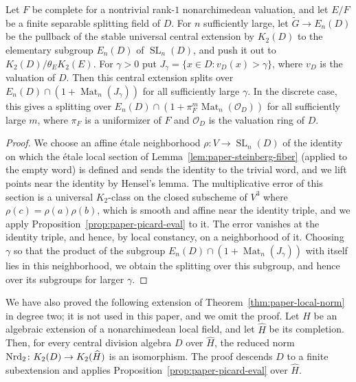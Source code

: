 \begin{corollary}\label{cor:paper-congruence-splitting}
Let $F$ be complete for a nontrivial rank-$1$ nonarchimedean valuation, and let $E/F$ be a finite separable splitting field of $D$.
For $n$ sufficiently large, let $\widetilde G\to E_n(D)$ be the pullback of the stable universal central extension by $K_2(D)$ to the elementary subgroup $E_n(D)$ of $\operatorname{SL}_n(D)$, and push it out to $K_2(D)/\theta_E K_2(E)$.
For $\gamma>0$ put $J_\gamma=\{x\in D:v_D(x)>\gamma\}$, where $v_D$ is the valuation of $D$.
Then this central extension splits over $E_n(D)\cap(1+\operatorname{Mat}_n(J_\gamma))$ for all sufficiently large $\gamma$.
In the discrete case, this gives a splitting over $E_n(D)\cap(1+\pi_F^m\operatorname{Mat}_n(\mathcal O_D))$ for all sufficiently large $m$, where $\pi_F$ is a uniformizer of $F$ and $\mathcal O_D$ is the valuation ring of $D$.
\end{corollary}
\begin{proof}
We choose an affine \'etale neighborhood $\rho\colon V\to\operatorname{SL}_n(D)$ of the identity on which the \'etale local section of Lemma~\ref{lem:paper-steinberg-fiber} (applied to the empty word) is defined and sends the identity to the trivial word, and we lift points near the identity by Hensel's lemma.
The multiplicative error of this section is a universal $K_2$-class on the closed subscheme of $V^3$ where $\rho(c)=\rho(a)\rho(b)$, which is smooth and affine near the identity triple, and we apply Proposition~\ref{prop:paper-picard-eval} to it.
The error vanishes at the identity triple, and hence, by local constancy, on a neighborhood of it.
Choosing $\gamma$ so that the product of the subgroup $E_n(D)\cap(1+\operatorname{Mat}_n(J_\gamma))$ with itself lies in this neighborhood, we obtain the splitting over this subgroup, and hence over its subgroups for larger $\gamma$.
\end{proof}

\begin{remark}\label{rem:paper-local-completion}
We have also proved the following extension of Theorem~\ref{thm:paper-local-norm} in degree two; it is not used in this paper, and we omit the proof.
Let $H$ be an algebraic extension of a nonarchimedean local field, and let $\widehat H$ be its completion.
Then, for every central division algebra $D$ over $\widehat H$, the reduced norm $\operatorname{Nrd}_2\colon K_2(D)\to K_2(\widehat H)$ is an isomorphism.
The proof descends $D$ to a finite subextension and applies Proposition~\ref{prop:paper-picard-eval} over $\widehat H$.
\end{remark}
